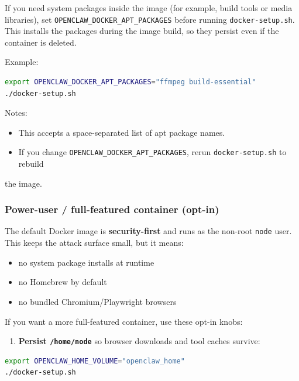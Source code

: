 If you need system packages inside the image (for example, build tools or media
libraries), set \texttt{OPENCLAW\_DOCKER\_APT\_PACKAGES} before running \texttt{docker-setup.sh}.
This installs the packages during the image build, so they persist even if the
container is deleted.

Example:

\begin{lstlisting}[language=bash]
export OPENCLAW_DOCKER_APT_PACKAGES="ffmpeg build-essential"
./docker-setup.sh
\end{lstlisting}


Notes:

\begin{itemize}
  \item This accepts a space-separated list of apt package names.
  \item If you change \texttt{OPENCLAW\_DOCKER\_APT\_PACKAGES}, rerun \texttt{docker-setup.sh} to rebuild
\end{itemize}

the image.

\subsubsection{Power-user / full-featured container (opt-in)}


The default Docker image is \textbf{security-first} and runs as the non-root \texttt{node}
user. This keeps the attack surface small, but it means:

\begin{itemize}
  \item no system package installs at runtime
  \item no Homebrew by default
  \item no bundled Chromium/Playwright browsers
\end{itemize}


If you want a more full-featured container, use these opt-in knobs:

\begin{enumerate}
  \item \textbf{Persist \texttt{/home/node}} so browser downloads and tool caches survive:
\end{enumerate}


\begin{lstlisting}[language=bash]
export OPENCLAW_HOME_VOLUME="openclaw_home"
./docker-setup.sh
\end{lstlisting}


